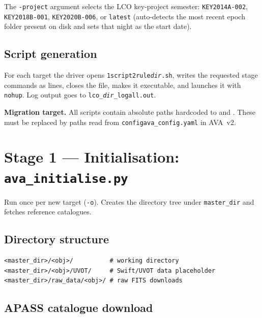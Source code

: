 \documentclass[12pt,a4paper]{article}
\begin{document}
The \texttt{-project} argument selects the LCO key-project semester: \texttt{KEY2014A-002},
\texttt{KEY2018B-001}, \texttt{KEY2020B-006}, or \texttt{latest} (auto-detects the most
recent epoch folder present on disk and sets that night as the start date).

\subsection{Script generation}

For each target the driver opens \texttt{1script2rule\textit{dir}.sh}, writes the requested
stage commands as lines, closes the file, makes it executable, and launches it with
\texttt{nohup}.  Log output goes to \texttt{lco\_\textit{dir}\_logall.out}.

\begin{warnbox}
\textbf{Migration target.}  All scripts contain absolute paths hardcoded to
 and .  These must be replaced by
paths read from \texttt{config\/\hspace{0pt}ava\_\hspace{0pt}config.yaml} in AVA~v2.
\end{warnbox}

\section{Stage 1 --- Initialisation: \texorpdfstring{\texttt{ava\_initialise.py}}{ava_initialise.py}}
\label{sec:init}

Run once per new target (\texttt{-o}).  Creates the directory tree under
\texttt{master\_dir} and fetches reference catalogues.

\subsection{Directory structure}
\begin{lstlisting}[style=shell]
<master_dir>/<obj>/          # working directory
<master_dir>/<obj>/UVOT/     # Swift/UVOT data placeholder
<master_dir>/raw_data/<obj>/ # raw FITS downloads
\end{lstlisting}

\subsection{APASS catalogue download}
\end{document}

